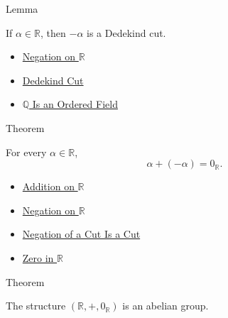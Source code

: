 \begin{lemmabox}{Lemma}
\begin{lemma}
\label{lem:negation-of-cut-is-a-cut}
If $\alpha\in\mathbb{R}$, then $-\alpha$ is a Dedekind cut.
\end{lemma}
\end{lemmabox}

\begin{dependencies}
\begin{itemize}
  \item \hyperref[def:negation-on-r]{Negation on $\mathbb{R}$}
  \item \hyperref[def:dedekind-cut]{Dedekind Cut}
  \item \hyperref[thm:q-is-an-ordered-field]{$\mathbb{Q}$ Is an Ordered Field}
\end{itemize}
\end{dependencies}

\begin{theorembox}{Theorem}
\begin{theorem}
\label{thm:negation-additive-inverse-on-r}
For every $\alpha\in\mathbb{R}$,
\[
\alpha+(-\alpha)=0_{\mathbb{R}}.
\]
\end{theorem}
\end{theorembox}

\begin{dependencies}
\begin{itemize}
  \item \hyperref[def:addition-on-r]{Addition on $\mathbb{R}$}
  \item \hyperref[def:negation-on-r]{Negation on $\mathbb{R}$}
  \item \hyperref[lem:negation-of-cut-is-a-cut]{Negation of a Cut Is a Cut}
  \item \hyperref[def:zero-in-r]{Zero in $\mathbb{R}$}
\end{itemize}
\end{dependencies}

\begin{theorembox}{Theorem}
\begin{theorem}
\label{thm:r-additive-abelian-group}
The structure $(\mathbb{R},+,0_{\mathbb{R}})$ is an abelian group.
\end{theorem}
\end{theorembox}

